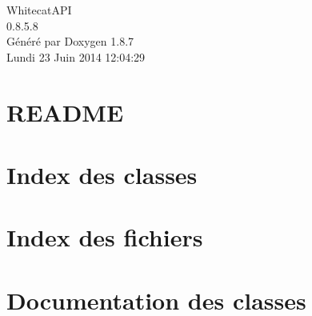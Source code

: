 \documentclass[twoside]{book}
\newcommand{\+}{\discretionary{\mbox{\scriptsize$\hookleftarrow$}}{}{}}
\newcommand{\clearemptydoublepage}{%
  \newpage{\pagestyle{empty}\cleardoublepage}%
}
\begin{document}
\hypersetup{pageanchor=false,
             bookmarks=true,
             bookmarksnumbered=true,
             pdfencoding=unicode
            }
\begin{titlepage}
\vspace*{7cm}
\begin{center}%
{\Large Whitecat\+A\+P\+I \\[1ex]\large 0.\+8.\+5.\+8 }\\
\vspace*{1cm}
{\large Généré par Doxygen 1.8.7}\\
\vspace*{0.5cm}
{\small Lundi 23 Juin 2014 12:04:29}\\
\end{center}
\end{titlepage}
\clearemptydoublepage
\tableofcontents
\clearemptydoublepage
{}
\hypersetup{pageanchor=true}

\chapter{R\+E\+A\+D\+M\+E}
\label{md__r_e_a_d_m_e}
\hypertarget{md__r_e_a_d_m_e}{}

\chapter{Index des classes}

\chapter{Index des fichiers}

\chapter{Documentation des classes}






\end{document}
